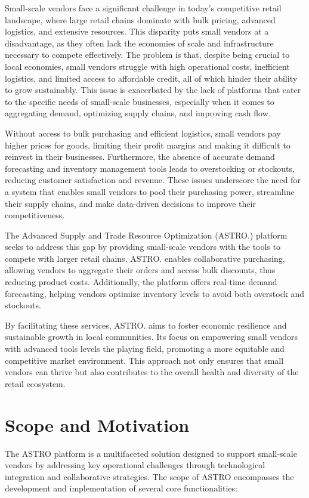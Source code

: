 Small-scale vendors face a significant challenge in today’s competitive retail landscape, where large retail chains dominate with bulk pricing, advanced logistics, and extensive resources. This disparity puts small vendors at a disadvantage, as they often lack the economies of scale and infrastructure necessary to compete effectively. The problem is that, despite being crucial to local economies, small vendors struggle with high operational costs, inefficient logistics, and limited access to affordable credit, all of which hinder their ability to grow sustainably. This issue is exacerbated by the lack of platforms that cater to the specific needs of small-scale businesses, especially when it comes to aggregating demand, optimizing supply chains, and improving cash flow.

Without access to bulk purchasing and efficient logistics, small vendors pay higher prices for goods, limiting their profit margins and making it difficult to reinvest in their businesses. Furthermore, the absence of accurate demand forecasting and inventory management tools leads to overstocking or stockouts, reducing customer satisfaction and revenue. These issues underscore the need for a system that enables small vendors to pool their purchasing power, streamline their supply chains, and make data-driven decisions to improve their competitiveness.

The Advanced Supply and Trade Resource Optimization (ASTRO.) platform seeks to address this gap by providing small-scale vendors with the tools to compete with larger retail chains. ASTRO. enables collaborative purchasing, allowing vendors to aggregate their orders and access bulk discounts, thus reducing product costs. Additionally, the platform offers real-time demand forecasting, helping vendors optimize inventory levels to avoid both overstock and stockouts. 

By facilitating these services, ASTRO. aims to foster economic resilience and sustainable growth in local communities. Its focus on empowering small vendors with advanced tools levels the playing field, promoting a more equitable and competitive market environment. This approach not only ensures that small vendors can thrive but also contributes to the overall health and diversity of the retail ecosystem.

\section{Scope and Motivation}
The ASTRO platform is a multifaceted solution designed to support small-scale vendors by addressing key operational challenges through technological integration and collaborative strategies. The scope of ASTRO encompasses the development and implementation of several core functionalities:

